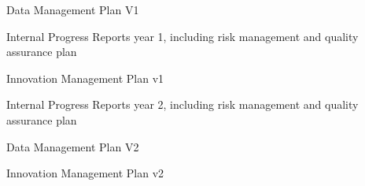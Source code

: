 \begin{workpackage}
\begin{wpdelivs}
\begin{wpdeliv}[due=6,miles=startup,id=data-plan1,dissem=PU,nature=R,lead=UPSud]{Data Management Plan V1}
\end{wpdeliv}

\begin{wpdeliv}[due=12,miles=startup,lead=UPSud,
id=ipr,dissem=CO,nature=R]{Internal Progress Reports year 1, including risk management and quality assurance plan}
\end{wpdeliv}

\begin{wpdeliv}[due=18,miles=proto1,lead=UPSud,
id=tickets,dissem=CO,nature=R]{Innovation Management Plan v1}
\end{wpdeliv}

\begin{wpdeliv}[due=36,miles=community,lead=UPSud,
id=ipr2,dissem=CO,nature=R]{Internal Progress Reports year 2, including risk management and quality assurance plan}
\end{wpdeliv}
\begin{wpdeliv}[due=36,miles=community,id=data-plan2,dissem=PU,nature=R,lead=PS]{Data Management Plan V2}
\end{wpdeliv}

\begin{wpdeliv}[due=45,lead=UPSud,miles=eval,
id=tickets,dissem=CO,nature=R]{Innovation Management Plan v2}
\end{wpdeliv}




\end{wpdelivs}
\end{workpackage}

